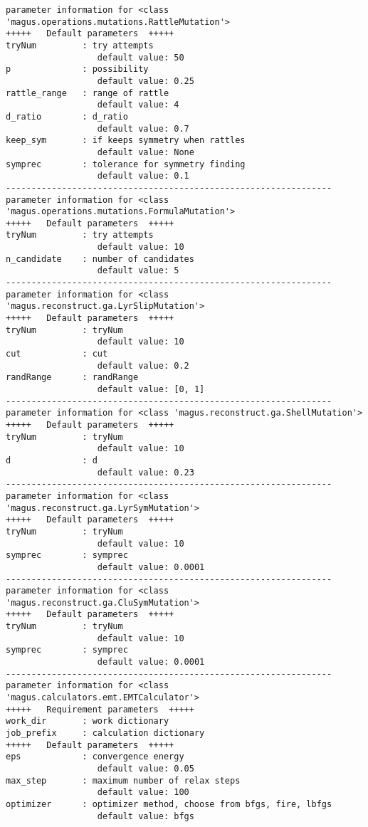 \documentclass[12pt,oneside]{book}
\begin{document}
\begin{tcolorbox}
\begin{verbatim}
parameter information for <class 'magus.operations.mutations.RattleMutation'>
+++++	Default parameters	+++++
tryNum         : try attempts
                  default value: 50
p              : possibility
                  default value: 0.25
rattle_range   : range of rattle
                  default value: 4
d_ratio        : d_ratio
                  default value: 0.7
keep_sym       : if keeps symmetry when rattles
                  default value: None
symprec        : tolerance for symmetry finding
                  default value: 0.1
----------------------------------------------------------------
parameter information for <class 'magus.operations.mutations.FormulaMutation'>
+++++	Default parameters	+++++
tryNum         : try attempts
                  default value: 10
n_candidate    : number of candidates
                  default value: 5
----------------------------------------------------------------
parameter information for <class 'magus.reconstruct.ga.LyrSlipMutation'>
+++++	Default parameters	+++++
tryNum         : tryNum
                  default value: 10
cut            : cut
                  default value: 0.2
randRange      : randRange
                  default value: [0, 1]
----------------------------------------------------------------
parameter information for <class 'magus.reconstruct.ga.ShellMutation'>
+++++	Default parameters	+++++
tryNum         : tryNum
                  default value: 10
d              : d
                  default value: 0.23
----------------------------------------------------------------
parameter information for <class 'magus.reconstruct.ga.LyrSymMutation'>
+++++	Default parameters	+++++
tryNum         : tryNum
                  default value: 10
symprec        : symprec
                  default value: 0.0001
----------------------------------------------------------------
parameter information for <class 'magus.reconstruct.ga.CluSymMutation'>
+++++	Default parameters	+++++
tryNum         : tryNum
                  default value: 10
symprec        : symprec
                  default value: 0.0001
----------------------------------------------------------------
parameter information for <class 'magus.calculators.emt.EMTCalculator'>
+++++	Requirement parameters	+++++
work_dir       : work dictionary
job_prefix     : calculation dictionary
+++++	Default parameters	+++++
eps            : convergence energy
                  default value: 0.05
max_step       : maximum number of relax steps
                  default value: 100
optimizer      : optimizer method, choose from bfgs, fire, lbfgs
                  default value: bfgs

\end{verbatim}
\end{tcolorbox}
\end{document}
